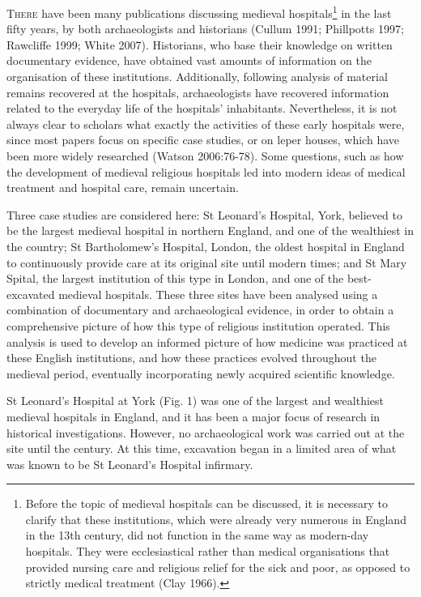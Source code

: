 \documentclass[%
	]{ijsra}
\begin{document}
\IJSRAopening%
\lettrine{T}{here} have been many publications discussing medieval hospitals\footnote{Before the topic of medieval hospitals can be discussed, it is necessary to clarify that these institutions, which were already very numerous in England in the 13th century, did not function in the same way as modern-day hospitals. They were ecclesiastical rather than medical organisations that provided nursing care and religious relief for the sick and poor, as opposed to strictly medical treatment (Clay 1966).} 
in the last fifty years, by both archaeologists and historians (Cullum 1991; Phillpotts 1997; Rawcliffe 1999; White 2007). 
Historians, who base their knowledge on written documentary evidence, have obtained vast amounts of information on the organisation of these institutions. Additionally, following analysis of material remains recovered at the hospitals, archaeologists have recovered information related to the everyday life of the hospitals’ inhabitants. Nevertheless, it is not always clear to scholars what exactly the activities of these early hospitals were, since most papers focus on specific case studies, or on leper houses, which have been more widely researched (Watson 2006:76-78). 
Some questions, such as how the development of medieval religious hospitals led into modern ideas of medical treatment and hospital care, remain uncertain.

Three case studies are considered here: St Leonard’s Hospital, York, believed to be the largest medieval hospital in northern England, and one of the wealthiest in the country; St Bartholomew’s Hospital, London, the oldest hospital in England to continuously provide care at its original site until modern times; and St Mary Spital, the largest institution of this type in London, and one of the best-excavated medieval hospitals. 
These three sites have been analysed using a combination of documentary and archaeological evidence, in order to obtain a comprehensive picture of how this type of religious institution operated. This analysis is used to develop an informed picture of how medicine was practiced at these English institutions, and how these practices evolved throughout the medieval period, eventually incorporating newly acquired scientific knowledge.


St Leonard’s Hospital at York (Fig. 1) %
 was one of the largest and wealthiest medieval hospitals in England, and it has been a major focus of research in historical investigations. However, no archaeological work was carried out at the site until the  century. 
 At this time, excavation began in a limited area of what was known to be St Leonard’s Hospital infirmary.
 
\end{document}
